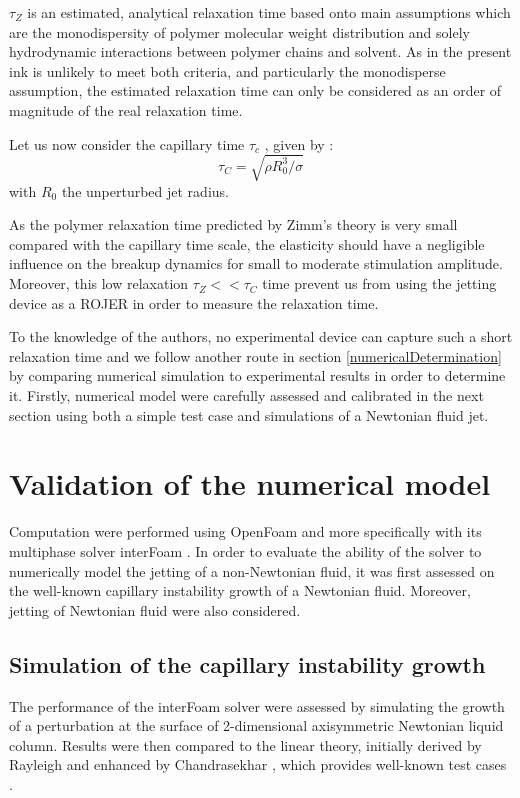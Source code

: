 \documentclass[onecolumn, 12pt]{asme2ej}
\begin{document}
$\tau_Z$ is an estimated, analytical relaxation time based onto main assumptions which are the monodispersity of polymer molecular weight distribution and solely hydrodynamic interactions between polymer chains and solvent. As in the present ink is unlikely to meet both criteria, and particularly the monodisperse assumption, the estimated relaxation time can only be considered as an order of magnitude of the real relaxation time.


Let us now consider the capillary time $\tau_c$ , given by :
\begin{equation}
    \tau_C= \sqrt{\rho R_0^3 / \sigma}
\end{equation}
with $R_0$ the unperturbed jet radius. 

As the polymer relaxation time predicted by Zimm's theory is very small compared with the capillary time scale, the elasticity should have a negligible influence on the breakup dynamics for small to moderate stimulation amplitude. Moreover, this low relaxation $\tau_Z<<\tau_C$ time prevent us from using the jetting device as a ROJER \cite{keshavarz2015studying} in order to measure the relaxation time. 

To the knowledge of the authors, no experimental device can capture such a short relaxation time and we follow another route in section \ref{numericalDetermination} by comparing numerical simulation to experimental results in order to determine it. Firstly, numerical model were carefully assessed and calibrated in the next section using both a simple test case and simulations of a Newtonian fluid jet.

\section{Validation of the numerical model}
Computation were performed using {OpenFoam\textregistered} and more specifically with its multiphase solver interFoam \cite{deshpande2012evaluating}. In order to evaluate the ability of the solver to numerically model the jetting of a non-Newtonian fluid, it was first assessed on the well-known capillary instability growth of a Newtonian fluid. Moreover, jetting of Newtonian fluid were also considered.

\subsection{Simulation of the capillary instability growth}
The performance of the interFoam solver were assessed by simulating the growth of a perturbation at the surface of 2-dimensional axisymmetric Newtonian liquid column. Results were then compared to the linear theory, initially derived by Rayleigh \cite{rayleigh1892xvi} and enhanced by Chandrasekhar \cite{chandrasekhar2013hydrodynamic}, which provides well-known test cases \cite{delteil2011numerical,cervone2010simulation}.
\end{document}
